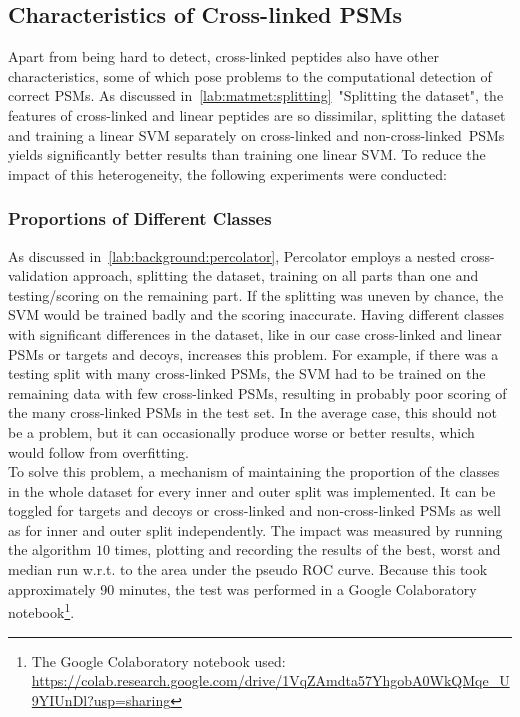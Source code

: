 \subsection{Characteristics of Cross-linked PSMs}
Apart from being hard to detect, cross-linked peptides also have other characteristics, some of which pose problems to the computational detection of correct PSMs. As discussed in~\ref{lab:matmet:splitting}~"Splitting the dataset", the features of cross-linked and linear peptides are so dissimilar, splitting the dataset and training a linear SVM separately on cross-linked and non-cross-linked~PSMs yields significantly better results than training one linear SVM. To reduce the impact of this heterogeneity, the following experiments were conducted:
\subsubsection{Proportions of Different Classes}
\label{lab:matmet:proportions}
As discussed in~\ref{lab:background:percolator}, Percolator employs a nested cross-validation approach, splitting the dataset, training on all parts than one and testing/scoring on the remaining part. If the splitting was uneven by chance, the SVM would be trained badly and the scoring inaccurate. Having different classes with significant differences in the dataset, like in our case cross-linked and linear PSMs or targets and decoys, increases this problem. For example, if there was a testing split with many cross-linked PSMs, the SVM had to be trained on the remaining data with few cross-linked PSMs, resulting in probably poor scoring of the many cross-linked PSMs in the test set. In the average case, this should not be a problem, but it can occasionally produce worse or better results, which would follow from overfitting.\\
To solve this problem, a mechanism of maintaining the proportion of the classes in the whole dataset for every inner and outer split was implemented. It can be toggled for targets and decoys or cross-linked and non-cross-linked PSMs as well as for inner and outer split independently. The impact was measured by running the algorithm $10$ times, plotting and recording the results of the best, worst and median run w.r.t. to the area under the pseudo ROC curve. Because this took approximately 90 minutes, the test was performed in a Google Colaboratory notebook\footnote{The Google Colaboratory notebook used:\\ \url{https://colab.research.google.com/drive/1VqZAmdta57YhgobA0WkQMqe_U9YIUnDl?usp=sharing}}.
